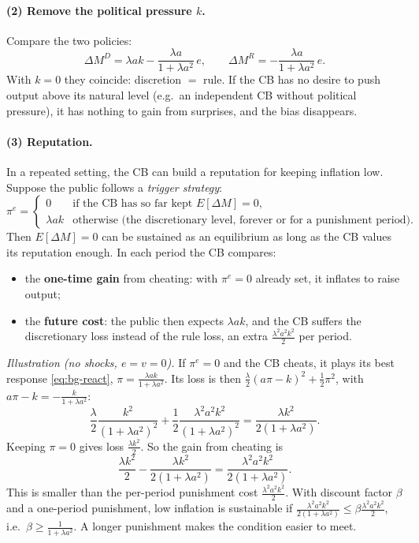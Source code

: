 \paragraph{(2) Remove the political pressure $k$.} Compare the two policies:
\[
\Delta M^D=\lambda ak-\frac{\lambda a}{1+\lambda a^2}\,e,\qquad
\Delta M^R=-\frac{\lambda a}{1+\lambda a^2}\,e .
\]
With $k=0$ they coincide: discretion $=$ rule. If the CB has no desire to push output above its natural level (e.g.\ an independent CB without political pressure), it has nothing to gain from surprises, and the bias disappears.

\paragraph{(3) Reputation.} In a repeated setting, the CB can build a reputation for keeping inflation low. Suppose the public follows a \emph{trigger strategy}:
\[
\pi^e=\begin{cases}0 & \text{if the CB has so far kept } E[\Delta M]=0,\\[2pt] \lambda ak & \text{otherwise (the discretionary level, forever or for a punishment period).}\end{cases}
\]
Then $E[\Delta M]=0$ can be sustained as an equilibrium as long as the CB values its reputation enough. In each period the CB compares:
\begin{itemize}
  \item the \textbf{one-time gain} from cheating: with $\pi^e=0$ already set, it inflates to raise output;
  \item the \textbf{future cost}: the public then expects $\lambda ak$, and the CB suffers the discretionary loss instead of the rule loss, an extra $\frac{\lambda^2a^2k^2}{2}$ per period.
\end{itemize}
\emph{Illustration (no shocks, $e=v=0$).} If $\pi^e=0$ and the CB cheats, it plays its best response \eqref{eq:bg-react}, $\pi=\frac{\lambda ak}{1+\lambda a^2}$. Its loss is then $\frac{\lambda}{2}(a\pi-k)^2+\frac12\pi^2$, with $a\pi-k=-\frac{k}{1+\lambda a^2}$:
\[
\frac{\lambda}{2}\frac{k^2}{(1+\lambda a^2)^2}+\frac12\frac{\lambda^2a^2k^2}{(1+\lambda a^2)^2}=\frac{\lambda k^2}{2(1+\lambda a^2)} .
\]
Keeping $\pi=0$ gives loss $\frac{\lambda k^2}{2}$. So the gain from cheating is
\[
\frac{\lambda k^2}{2}-\frac{\lambda k^2}{2(1+\lambda a^2)}=\frac{\lambda^2a^2k^2}{2(1+\lambda a^2)} .
\]
This is smaller than the per-period punishment cost $\frac{\lambda^2a^2k^2}{2}$. With discount factor $\beta$ and a one-period punishment, low inflation is sustainable if $\frac{\lambda^2a^2k^2}{2(1+\lambda a^2)}\le\beta\frac{\lambda^2a^2k^2}{2}$, i.e.\ $\beta\ge\frac{1}{1+\lambda a^2}$. A longer punishment makes the condition easier to meet.

